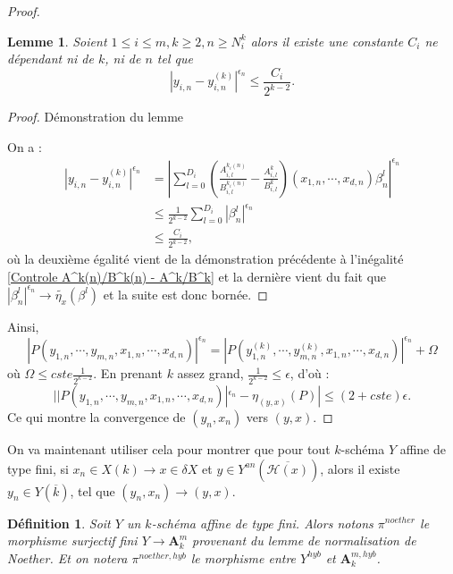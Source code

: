 \documentclass[11pt]{article}
\newcommand{\ana}{\mathbf{A}}
\newtheorem{lem}[thm]{Lemme}
\newtheorem{defi}[thm]{Définition}
\begin{document}
\begin{proof}
\begin{lem}
Soient $1\leq i \leq m, k \geq 2, n \geq N^k_{i}$ alors il existe une constante $C_{i}$ ne dépendant ni de $k$, ni de $n$ tel que 
\begin{equation*}
|y_{i,n} - y^{(k)}_{i,n}|^{\epsilon_n} \leq \frac{C_{i}}{2^{k-2}}.
\end{equation*}
\end{lem}
\begin{proof}Démonstration du lemme

On a :
\begin{align*}
|y_{i,n} - y^{(k)}_{i,n}|^{\epsilon_n} &= |\sum\limits_{l=0}^{D_{i}} (\frac{A_{i,l}^{k_{i}(n)}}{B_{i,l}^{k_{i}(n)}} - \frac{A_{i,l}^{k}}{B_{i,l}^{k}}) (x_{1,n}, \cdots, x_{d,n})\beta_n^l|^{\epsilon_n}\\
&\leq \frac{1}{2^{k-2}} \sum\limits_{l=0}^{D_{i}} |\beta_{n}^l|^{\epsilon_n}\\
&\leq \frac{C_{i}}{2^{k-2}},
\end{align*}
où la deuxième égalité vient de la démonstration précédente à l'inégalité \ref{Controle A^k(n)/B^k(n) - A^k/B^k} et la dernière vient du fait que $|\beta_{n}^l|^{\epsilon_n} \rightarrow \tilde{\eta_x}(\beta^l)$ et la suite est donc bornée.
\end{proof}
Ainsi,
\begin{equation*}
|P(y_{1,n}, \cdots, y_{m,n}, x_{1,n}, \cdots, x_{d,n})|^{\epsilon_n} = |P(y^{(k)}_{1,n}, \cdots, y^{(k)}_{m,n}, x_{1,n}, \cdots, x_{d,n})|^{\epsilon_n} + \Omega
\end{equation*}
où $\Omega \leq cste \frac{1}{2^{k-2}}$. En prenant $k$ assez grand, $\frac{1}{2^{k-2}} \leq \epsilon$, d'où :
\begin{equation*}
||P(y_{1,n}, \cdots, y_{m,n}, x_{1,n}, \cdots, x_{d,n})|^{\epsilon_n} - \eta_{(y,x)}(P)| \leq (2 + cste) \epsilon.
\end{equation*}
Ce qui montre la convergence de $(y_n, x_n)$ vers $(y,x)$.
\end{proof}

On va maintenant utiliser cela pour montrer que pour tout $k$-schéma $Y$ affine de type fini, si $x_n \in X(k) \rightarrow x \in \delta X$ et $y \in Y^{an}(\overline{\mathcal{H}(x)})$, alors il existe $y_n \in Y(\overline{k})$, tel que $(y_n, x_n) \rightarrow (y,x)$.

\begin{defi}\label{defi normalisation noether}
Soit $Y$ un $k$-schéma affine de type fini. Alors notons $\pi^{noether}$ le morphisme surjectif fini $Y \rightarrow \ana^m_k$ provenant du lemme de normalisation de Noether. Et on notera $\pi^{noether, hyb}$ le morphisme entre $Y^{hyb}$ et $\ana_k^{m,hyb}$.
\end{defi}
\end{document}

